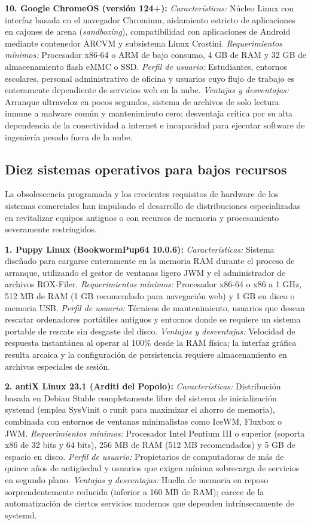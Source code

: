 \documentclass[12pt]{article}
\begin{document}
\smallskip
\noindent\textbf{10. Google ChromeOS (versión 124+):}
\textit{Características:} Núcleo Linux con interfaz basada en el navegador Chromium, aislamiento estricto de aplicaciones en cajones de arena (\textit{sandboxing}), compatibilidad con aplicaciones de Android mediante contenedor ARCVM y subsistema Linux Crostini.
\textit{Requerimientos mínimos:} Procesador x86-64 o ARM de bajo consumo, 4 GB de RAM y 32 GB de almacenamiento flash eMMC o SSD.
\textit{Perfil de usuario:} Estudiantes, entornos escolares, personal administrativo de oficina y usuarios cuyo flujo de trabajo es enteramente dependiente de servicios web en la nube.
\textit{Ventajas y desventajas:} Arranque ultraveloz en pocos segundos, sistema de archivos de solo lectura inmune a malware común y mantenimiento cero; desventaja crítica por su alta dependencia de la conectividad a internet e incapacidad para ejecutar software de ingeniería pesado fuera de la nube.

\subsection{Diez sistemas operativos para bajos recursos}\label{sec:diezSoBajosRecursos}

La obsolescencia programada y los crecientes requisitos de hardware de los sistemas comerciales han impulsado el desarrollo de distribuciones especializadas en revitalizar equipos antiguos o con recursos de memoria y procesamiento severamente restringidos.

\smallskip
\noindent\textbf{1. Puppy Linux (BookwormPup64 10.0.6):}
\textit{Características:} Sistema diseñado para cargarse enteramente en la memoria RAM durante el proceso de arranque, utilizando el gestor de ventanas ligero JWM y el administrador de archivos ROX-Filer.
\textit{Requerimientos mínimos:} Procesador x86-64 o x86 a 1 GHz, 512 MB de RAM (1 GB recomendado para navegación web) y 1 GB en disco o memoria USB.
\textit{Perfil de usuario:} Técnicos de mantenimiento, usuarios que desean rescatar ordenadores portátiles antiguos y entornos donde se requiere un sistema portable de rescate sin desgaste del disco.
\textit{Ventajas y desventajas:} Velocidad de respuesta instantánea al operar al 100\% desde la RAM física; la interfaz gráfica resulta arcaica y la configuración de persistencia requiere almacenamiento en archivos especiales de sesión.

\smallskip
\noindent\textbf{2. antiX Linux 23.1 (Arditi del Popolo):}
\textit{Características:} Distribución basada en Debian Stable completamente libre del sistema de inicialización systemd (emplea SysVinit o runit para maximizar el ahorro de memoria), combinada con entornos de ventanas minimalistas como IceWM, Fluxbox o JWM.
\textit{Requerimientos mínimos:} Procesador Intel Pentium III o superior (soporta x86 de 32 bits y 64 bits), 256 MB de RAM (512 MB recomendados) y 5 GB de espacio en disco.
\textit{Perfil de usuario:} Propietarios de computadoras de más de quince años de antigüedad y usuarios que exigen mínima sobrecarga de servicios en segundo plano.
\textit{Ventajas y desventajas:} Huella de memoria en reposo sorprendentemente reducida (inferior a 160 MB de RAM); carece de la automatización de ciertos servicios modernos que dependen intrínsecamente de systemd.
\end{document}
